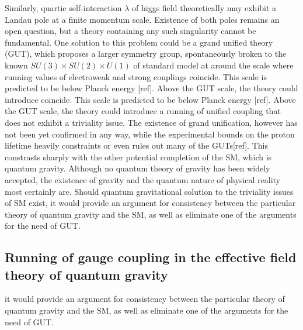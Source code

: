 \documentclass[11pt, a4paper]{article}
\begin{document}
Similarly, quartic self-interaction $\lambda$ of higgs field theoretically may exhibit a Landau pole at a finite momentum scale.
Existence of both poles remains an open question, but a theory containing any such singularity cannot be fundamental.
One solution to this problem could be a grand unified theory (GUT), which proposes a larger symmetry group, spontaneously broken
to the known $SU(3)\times SU(2) \times U(1)$ of standard model at around the scale where running values of electroweak and strong couplings
coincide. This scale is predicted to be below Planck energy [ref]. Above the GUT scale, the theory could introduce
coincide. This scale is predicted to be below Planck energy [ref]. Above the GUT scale, the theory could introduce
a running of unified coupling that does not exhibit a triviality issue.
The existence of grand unification, however has not been yet confirmed in any way, while the experimental bounds on the proton lifetime
heavily constraints or even rules out many of the GUTs[ref]. This constrasts sharply with the other potential completion of the SM,
which is quantum gravity. Although no quantum theory of gravity has been widely accepted, the existence of gravity and
the quantum nature of physical reality most certainly are. Should quantum gravitational solution to the triviality issues of SM exist,
it would provide an argument for consistency between the particular theory of quantum gravity and the SM, as well as eliminate one of the arguments for the need of GUT.
\subsection{Running of gauge coupling in the effective field theory of quantum gravity}
it would provide an argument for consistency between the particular theory of quantum gravity and the SM, as well as eliminate one of the arguments for the need of GUT.
\end{document}
